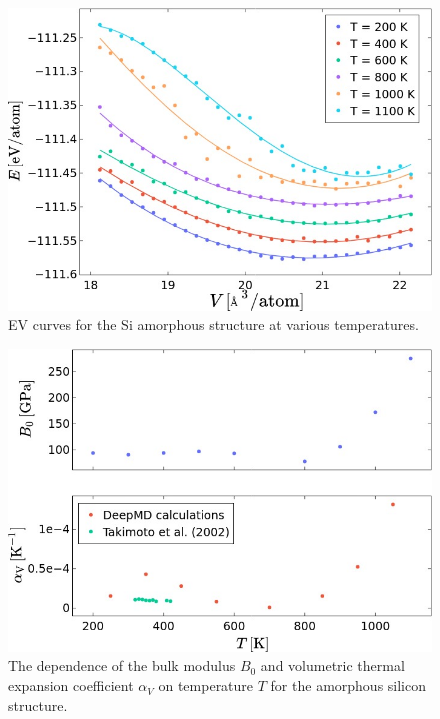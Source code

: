 \begin{figure}
  \begin{center}
    \includegraphics[width=.8\textwidth]{
      asset/amorphous_ev_curves.jpg
    }
  \end{center}
  \caption{EV curves for the Si amorphous structure at various
  temperatures.}
  \label{fig:amorphous_inference}
\end{figure}

\begin{figure}
  \begin{center}
    \includegraphics[width=.8\textwidth]{
      asset/amorphous_properties.jpg
    }
  \end{center}
  \caption{The dependence of the bulk modulus $B_0$ and volumetric thermal
  expansion coefficient $\alpha_V$ on temperature $T$ for the amorphous
  silicon structure.}
  \label{fig:amorphous_properties}
\end{figure}

